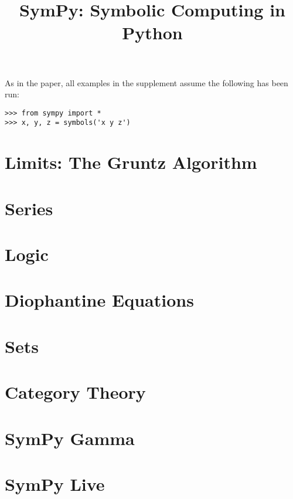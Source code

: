 \documentclass[supplement]{siamart0216}
\title{SymPy: Symbolic Computing in Python}
\begin{document}
\maketitle

As in the paper, all examples in the supplement assume the following has been
run:
\begin{verbatim}
>>> from sympy import *
>>> x, y, z = symbols('x y z')
\end{verbatim}

\section{Limits: The Gruntz Algorithm}



\section{Series}



\section{Logic}



\section{Diophantine Equations}



\section{Sets}


\section{Category Theory}


\section{SymPy Gamma}\label{sympy-gamma}



\section{SymPy Live}\label{sympy-live}
\end{document}
